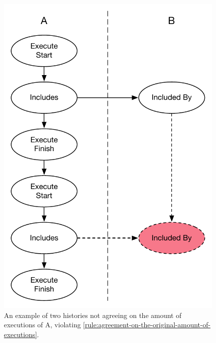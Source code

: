 	\begin{figure}[H]
		\centering
		\begin{minipage}{.45\textwidth}
			\includegraphics[width=\textwidth]{6validation/images/agreement-on-original-amount-of-executions-1.pdf}
			\caption{An example of two histories not agreeing on the amount of executions of A, violating \autoref{rule:agreement-on-the-original-amount-of-executions}.}
			\label{fig:agreement-on-the-original-amount-of-executions-1}
		\end{minipage}
		\hfill
		\begin{minipage}{.45\textwidth}

\end{minipage}
\end{figure}
